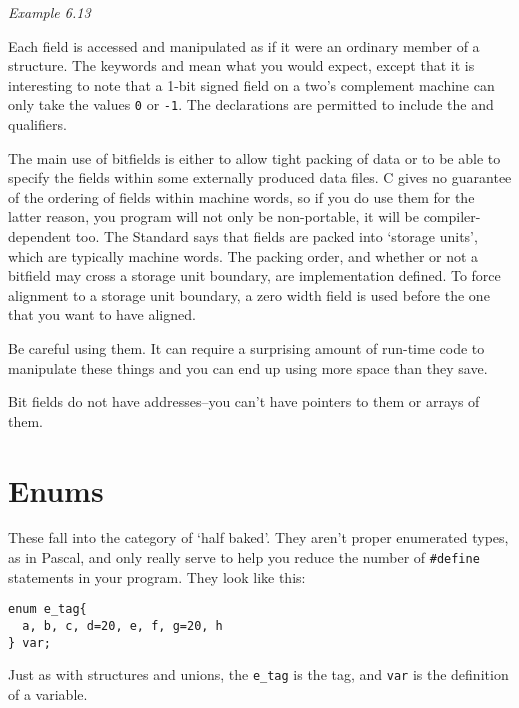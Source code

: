    \begin{center}\textit{Example 6.13}\end{center}


  Each field is accessed and manipulated as if it were an ordinary member of
   a structure. The keywords \signed{} and \unsigned{} mean
   what you would expect, except that it is interesting to note that a 1-bit
   signed field on a two's complement machine can only take the values
   \texttt{0} or \texttt{-1}. The declarations are permitted to include
   the \const{} and \volatile{} qualifiers.


  The main use of bitfields is either to allow tight packing of data or to
   be able to specify the fields within some externally produced data files.
   C gives no guarantee of the ordering of fields within machine words, so if
   you do use them for the latter reason, you program will not only be
   non-portable, it will be compiler-dependent too. The Standard says that
   fields are packed into `storage units', which are typically machine
   words. The packing order, and whether or not a bitfield may cross a storage
   unit boundary, are implementation defined. To force alignment to a storage
   unit boundary, a zero width field is used before the one that you want to
   have aligned.


  Be careful using them. It can require a surprising amount of run-time code
   to manipulate these things and you can end up using more space than they
   save.


  Bit fields do not have addresses--you can't have pointers to them or
   arrays of them.


 
        \section{Enums}
        

  

  These fall into the category of `half baked'. They aren't proper
   enumerated types, as in Pascal, and only really serve to help you reduce the
   number of \texttt{\#define} statements in your program. They look like
   this:


  \begin{Verbatim}
enum e_tag{
  a, b, c, d=20, e, f, g=20, h
} var;
\end{Verbatim}

  Just as with structures and unions, the \texttt{e\_tag} is the tag, and
   \texttt{var} is the definition of a variable.



